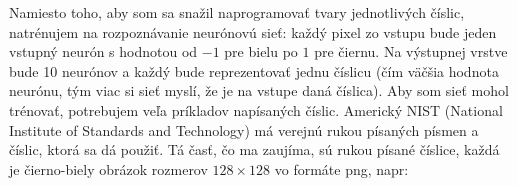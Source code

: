 Namiesto toho, aby som sa snažil naprogramovať tvary jednotlivých číslic, natrénujem na rozpoznávanie neurónovú sieť: každý pixel zo vstupu bude jeden vstupný neurón s hodnotou od
$-1$ pre 
bielu po $1$ pre čiernu. Na 
výstupnej vrstve bude 10 neurónov a každý bude reprezentovať jednu číslicu (čím väčšia hodnota neurónu, tým viac si sieť myslí, že je na vstupe daná číslica).
Aby som sieť mohol trénovať, potrebujem veľa príkladov napísaných číslic. Americký NIST (National Institute of Standards and Technology) má verejnú
 rukou písaných písmen a číslic, ktorá sa dá použiť. Tá časť, čo ma zaujíma, sú rukou písané číslice,
každá je čierno-biely obrázok rozmerov $128\times128$ vo formáte png, napr:

\hfill
{}
\hfill
{}
\hfill
{}
\hfill
{}
\hfill
{}

